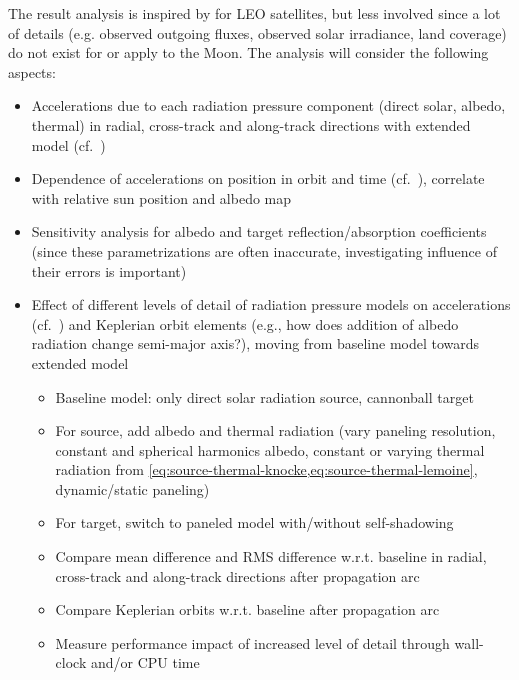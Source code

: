 \documentclass[parskip=full,DIV=15]{scrartcl}
\begin{document}
The result analysis is inspired by \textcite{Vielberg2020} for LEO satellites, but less involved since a lot of details (e.g. observed outgoing fluxes, observed solar irradiance, land coverage) do not exist for or apply to the Moon. The analysis will consider the following aspects:
\begin{itemize}
   \item Accelerations due to each radiation pressure component (direct solar, albedo, thermal) in radial, cross-track and along-track directions with extended model (cf.~\cite[Fig.~3]{Vielberg2020})
   \item Dependence of accelerations on position in orbit and time (cf.~\cite[Fig.~7]{Vielberg2020}), correlate with relative sun position and albedo map
   \item Sensitivity analysis for albedo and target reflection/absorption coefficients (since these parametrizations are often inaccurate, investigating influence of their errors is important)
   \item Effect of different levels of detail of radiation pressure models on accelerations (cf.~\cite[Fig.~8]{Vielberg2020}) and Keplerian orbit elements (e.g., how does addition of albedo radiation change semi-major axis?), moving from baseline model towards extended model
   \begin{itemize}
      \item Baseline model: only direct solar radiation source, cannonball target
      \item For source, add albedo and thermal radiation (vary paneling resolution, constant and spherical harmonics albedo, constant or varying thermal radiation from \cref{eq:source-thermal-knocke,eq:source-thermal-lemoine}, dynamic/static paneling)
      \item For target, switch to paneled model with/without self-shadowing
      \item Compare mean difference and RMS difference w.r.t. baseline in radial, cross-track and along-track directions after propagation arc
      \item Compare Keplerian orbits w.r.t. baseline after propagation arc
      \item Measure performance impact of increased level of detail through wall-clock and/or CPU time
   \end{itemize}
\end{itemize}
\end{document}
